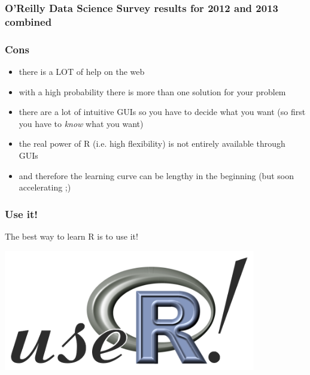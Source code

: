\documentclass[xcolor={table},c]{beamer}
\begin{document}
\begin{frame}\frametitle{O’Reilly Data Science Survey results for 2012 and 2013 combined}
  \begin{center}
  \end{center}
\end{frame}



\begin{frame}\frametitle{Cons}
  \begin{itemize}
    \item there is a LOT of help on the web
    \item with a high probability there is more than one solution for your problem
    \item there are a lot of intuitive GUIs so you have to decide what you want (so first you have to \emph{know} what you want)
    \item the real power of R (i.e. high flexibility) is not entirely available through GUIs
    \item and therefore the learning curve can be lengthy in the beginning (but soon accelerating ;)
  \end{itemize}
\end{frame}

\begin{frame}\frametitle{Use it!}
  The best way to learn R is to use it!
\begin{center}
 \includegraphics[width=11cm]{user.png}
\end{center}
\end{frame}
\end{document}
